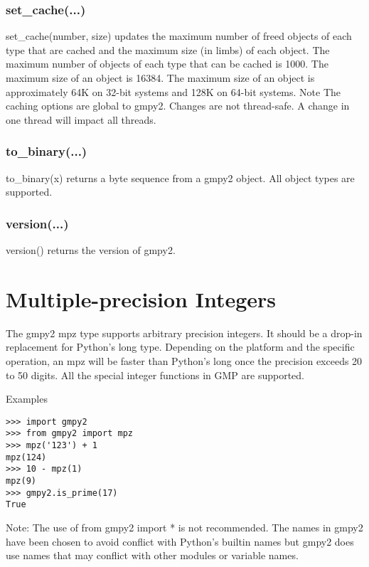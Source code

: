 \subsubsection{set\_cache(...)}

set\_cache(number, size) updates the maximum number of freed objects of each type that are
cached and the maximum size (in limbs) of each object. The maximum number of objects of
each type that can be cached is 1000. The maximum size of an object is 16384. The maximum
size of an object is approximately 64K on 32-bit systems and 128K on 64-bit systems.
Note
The caching options are global to gmpy2. Changes are not thread-safe. A change in one
thread will impact all threads.

\subsubsection{to\_binary(...)}

to\_binary(x) returns a byte sequence from a gmpy2 object. All object types are supported.

\subsubsection{version(...)}

version() returns the version of gmpy2.


\newpage
\section{Multiple-precision Integers}


The gmpy2 mpz type supports arbitrary precision integers. It should be a drop-in
replacement for Python's long type. Depending on the platform and the specific operation,
an mpz will be faster than Python's long once the precision exceeds 20 to 50 digits. All the
special integer functions in GMP are supported.

Examples

\begin{lstlisting}
>>> import gmpy2
>>> from gmpy2 import mpz
>>> mpz('123') + 1
mpz(124)
>>> 10 - mpz(1)
mpz(9)
>>> gmpy2.is_prime(17)
True
\end{lstlisting}



Note: The use of from gmpy2 import * is not recommended. The names in gmpy2 have
been chosen to avoid conflict with Python's builtin names but gmpy2 does use names that
may conflict with other modules or variable names.


